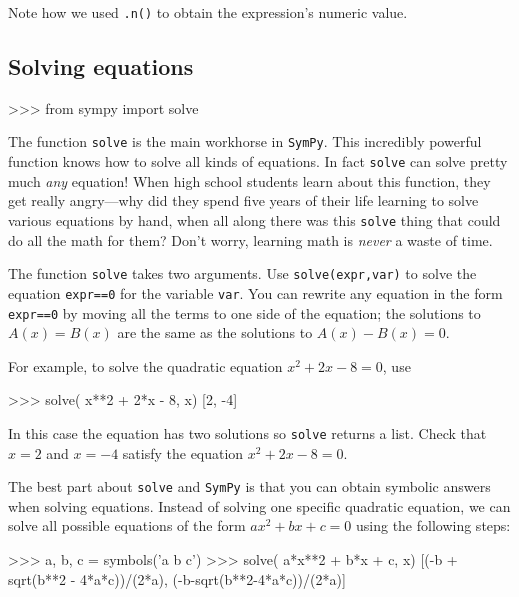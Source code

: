 \noindent
Note how we used \texttt{.n()} to obtain the expression's numeric value.

\subsection{Solving equations}
\label{basics:solving_equations}

\small
\begin{verbatimtab}
>>> from sympy import solve
\end{verbatimtab}
\normalsize

\noindent
The function \texttt{solve} is the main workhorse in \texttt{SymPy}. 
This incredibly powerful function knows how to solve all kinds of equations.
In fact \texttt{solve} can solve pretty much \emph{any} equation!
When high school students learn about this function, they get really angry---why 
did they spend five years of their life learning to solve various equations by hand,
when all along there was this \texttt{solve} thing that could do all the math for them?
Don't worry, learning math is \emph{never} a waste of time.


The function \texttt{solve} takes two arguments.
Use \texttt{solve(expr,var)} to solve the equation \texttt{expr==0} for the variable \texttt{var}.
You can rewrite any equation in the form \texttt{expr==0} by moving all the terms to one side of the equation;
the solutions to $A(x)=B(x)$ are the same as the solutions to $A(x)-B(x)=0$.

For example, 
to solve the quadratic equation $x^2+2x-8=0$, use

\small
\begin{verbatimtab}
>>> solve( x**2 + 2*x - 8, x)
[2, -4]
\end{verbatimtab}
\normalsize

\noindent
In this case the equation has two solutions so \texttt{solve} returns a list.
Check that $x=2$ and $x=-4$ satisfy the equation $x^2+2x-8=0$.

The best part about \texttt{solve} and \texttt{SymPy} is that you can obtain symbolic answers when solving equations. 
Instead of solving one specific quadratic equation,
we can solve all possible equations of the form $ax^2 + bx+c=0$ using the following steps:

\small
\begin{verbatimtab}
>>> a, b, c = symbols('a b c')
>>> solve( a*x**2 + b*x + c, x)
[(-b + sqrt(b**2 - 4*a*c))/(2*a), (-b-sqrt(b**2-4*a*c))/(2*a)]
\end{verbatimtab}
\normalsize

